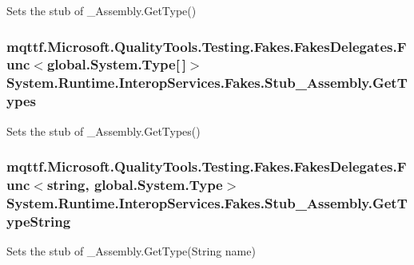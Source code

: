 Sets the stub of \-\_\-\-Assembly.\-Get\-Type()

\hypertarget{class_system_1_1_runtime_1_1_interop_services_1_1_fakes_1_1_stub___assembly_a384fbaf2f94c65c3b11574240e773e41}{
\subsubsection[{Get\-Types}]{\setlength{\rightskip}{0pt plus 5cm}mqttf.\-Microsoft.\-Quality\-Tools.\-Testing.\-Fakes.\-Fakes\-Delegates.\-Func$<$global.\-System.\-Type\mbox{[}$\,$\mbox{]}$>$ System.\-Runtime.\-Interop\-Services.\-Fakes.\-Stub\-\_\-\-Assembly.\-Get\-Types}}\label{class_system_1_1_runtime_1_1_interop_services_1_1_fakes_1_1_stub___assembly_a384fbaf2f94c65c3b11574240e773e41}


Sets the stub of \-\_\-\-Assembly.\-Get\-Types()

\hypertarget{class_system_1_1_runtime_1_1_interop_services_1_1_fakes_1_1_stub___assembly_a28217c8e85d6a741b5b2668f18aabe5a}{
\subsubsection[{Get\-Type\-String}]{\setlength{\rightskip}{0pt plus 5cm}mqttf.\-Microsoft.\-Quality\-Tools.\-Testing.\-Fakes.\-Fakes\-Delegates.\-Func$<$string, global.\-System.\-Type$>$ System.\-Runtime.\-Interop\-Services.\-Fakes.\-Stub\-\_\-\-Assembly.\-Get\-Type\-String}}\label{class_system_1_1_runtime_1_1_interop_services_1_1_fakes_1_1_stub___assembly_a28217c8e85d6a741b5b2668f18aabe5a}


Sets the stub of \-\_\-\-Assembly.\-Get\-Type(\-String name)

